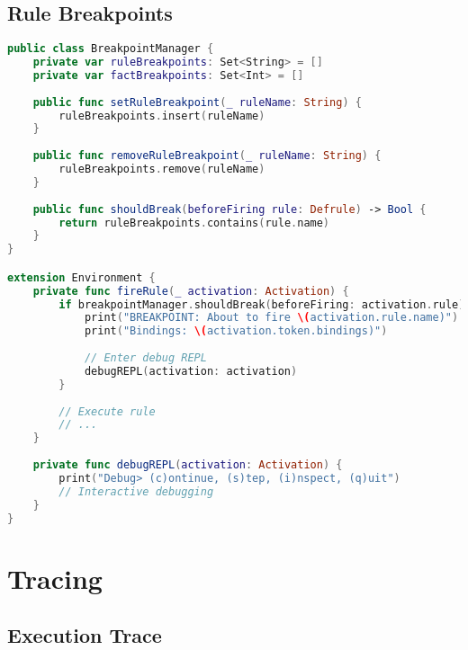 \subsection{Rule Breakpoints}

\begin{lstlisting}[language=Swift]
public class BreakpointManager {
    private var ruleBreakpoints: Set<String> = []
    private var factBreakpoints: Set<Int> = []
    
    public func setRuleBreakpoint(_ ruleName: String) {
        ruleBreakpoints.insert(ruleName)
    }
    
    public func removeRuleBreakpoint(_ ruleName: String) {
        ruleBreakpoints.remove(ruleName)
    }
    
    public func shouldBreak(beforeFiring rule: Defrule) -> Bool {
        return ruleBreakpoints.contains(rule.name)
    }
}

extension Environment {
    private func fireRule(_ activation: Activation) {
        if breakpointManager.shouldBreak(beforeFiring: activation.rule) {
            print("BREAKPOINT: About to fire \(activation.rule.name)")
            print("Bindings: \(activation.token.bindings)")
            
            // Enter debug REPL
            debugREPL(activation: activation)
        }
        
        // Execute rule
        // ...
    }
    
    private func debugREPL(activation: Activation) {
        print("Debug> (c)ontinue, (s)tep, (i)nspect, (q)uit")
        // Interactive debugging
    }
}
\end{lstlisting}

\section{Tracing}

\subsection{Execution Trace}

